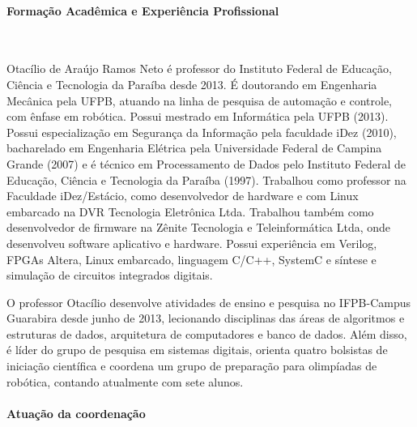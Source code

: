 \paragraph{Forma\c{c}\~ao Acad\^emica e Experi\^encia Profissional}\

Otac\'ilio de Ara\'ujo Ramos Neto \'e professor do Instituto Federal de Educação, Ciência e Tecnologia da Paraíba desde 2013. É doutorando em Engenharia Mecânica pela UFPB, atuando na linha de pesquisa de automação e controle, com ênfase em robótica. Possui mestrado em Informática pela UFPB (2013). Possui especialização em Segurança da Informação pela faculdade iDez (2010), bacharelado em Engenharia Elétrica pela Universidade Federal de Campina Grande (2007) e é técnico em Processamento de Dados pelo Instituto Federal de Educação, Ci\^encia e Tecnologia da Paraíba (1997). Trabalhou como professor na Faculdade iDez/Estácio, como desenvolvedor de hardware e com Linux embarcado na DVR Tecnologia Eletrônica Ltda. Trabalhou também como desenvolvedor de firmware na Zênite Tecnologia e Teleinformática Ltda, onde desenvolveu software aplicativo e hardware. Possui experiência em Verilog, FPGAs Altera, Linux embarcado, linguagem C/C++, SystemC e síntese e simulação de circuitos integrados digitais. 

O professor Otacílio desenvolve atividades de ensino e pesquisa no IFPB-Campus Guarabira desde junho de 2013, lecionando disciplinas das áreas de algoritmos e estruturas de dados, arquitetura de computadores e banco de dados. Além disso, é líder do grupo de pesquisa em sistemas digitais, orienta quatro bolsistas de iniciação científica e coordena um grupo de preparação para olimpíadas de robótica, contando atualmente com sete alunos.

\paragraph{Atua\c{c}\~ao da coordena\c{c}\~ao}\

